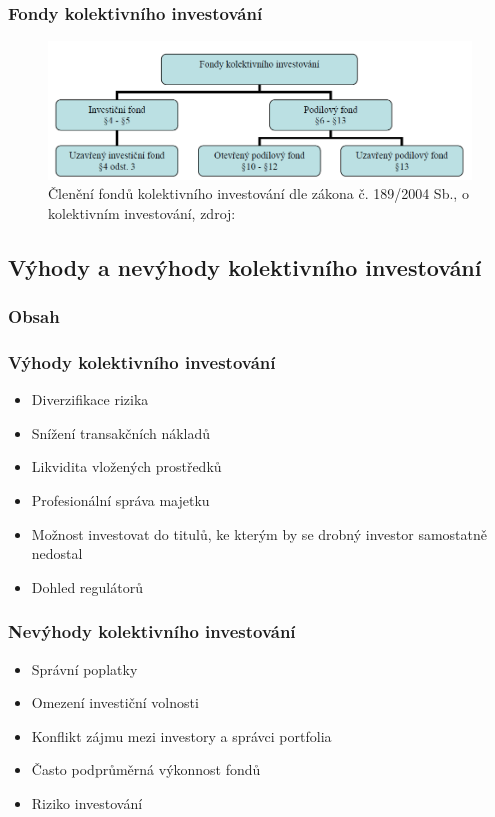 \documentclass{beamer}
\begin{document}
\begin{frame}
\frametitle{Fondy kolektivního investování}
\begin{figure}[htb]
\centering
\includegraphics[width=\textwidth]{deleni.png}
\caption{Členění fondů kolektivního investování dle zákona č. 189/2004 Sb., o kolektivním investování, zdroj: \cite{dp}}
\end{figure}
\end{frame}

  

\begin{frame}
\section{Výhody a nevýhody kolektivního investování}

\frametitle{Obsah}
\tableofcontents[currentsection]

\end{frame}




 
\begin{frame}
  \frametitle{Výhody kolektivního investování} 
    \begin{itemize} 
\item Diverzifikace rizika
\item Snížení transakčních nákladů 
\item Likvidita vložených prostředků
\item Profesionální správa majetku
\item Možnost investovat do titulů, ke kterým by se drobný investor samostatně nedostal
\item Dohled regulátorů
\end{itemize} 
\end{frame}




\begin{frame}
\frametitle{Nevýhody kolektivního investování} 
\begin{itemize} 
\item Správní poplatky
\item Omezení investiční volnosti
\item Konflikt zájmu mezi investory a správci portfolia
\item Často podprůměrná výkonnost fondů
\item Riziko investování
\end{itemize} 
\end{frame}
\end{document}
